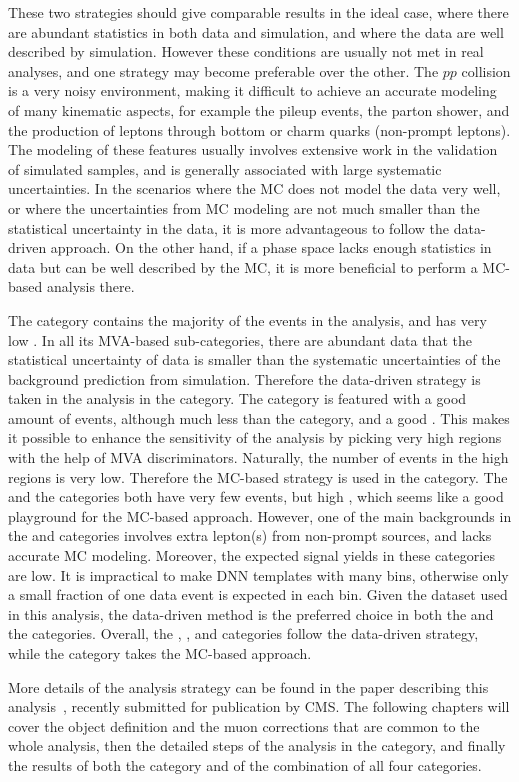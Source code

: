 These two strategies should give comparable results in the ideal case, where there are abundant statistics in both data and simulation,
and where the data are well described by simulation.
However these conditions are usually not met in real analyses, and one strategy may become preferable over the other.
The $pp$ collision is a very noisy environment, making it difficult to achieve an accurate modeling of many kinematic aspects,
for example the pileup events, the parton shower, and the production of leptons through bottom or charm quarks (non-prompt leptons).
The modeling of these features usually involves extensive work in the validation of simulated samples, and is generally associated with large systematic uncertainties.
In the scenarios where the MC does not model the data very well, or where the uncertainties from MC modeling are not much smaller than the statistical uncertainty in the data,
it is more advantageous to follow the data-driven approach.
On the other hand, if a phase space lacks enough statistics in data but can be well described by the MC, 
it is more beneficial to perform a MC-based analysis there.

The \ggH category contains the majority of the events in the \hmm analysis, and has very low \SoB. 
In all its MVA-based sub-categories, there are abundant data that the statistical uncertainty of data is smaller than the systematic uncertainties of the background prediction from simulation.
Therefore the data-driven strategy is taken in the analysis in the \ggH category.
The \qqH category is featured with a good amount of events, although much less than the \ggH category, and a good \SoB.
This makes it possible to enhance the sensitivity of the analysis by picking very high \SoB regions with the help of MVA discriminators. 
Naturally, the number of events in the high \SoB regions is very low. Therefore the MC-based strategy is used in the \qqH category.
The \VH and the \ttH categories both have very few events, but high \SoB, which seems like a good playground for the MC-based approach.
However, one of the main backgrounds in the \VH and \ttH categories involves extra lepton(s) from non-prompt sources, and lacks accurate MC modeling.
Moreover, the expected signal yields in these categories are low. 
It is impractical to make DNN templates with many bins, 
otherwise only a small fraction of one data event is expected in each bin.
Given the dataset used in this analysis, the data-driven method is the preferred choice in both the \VH and the \ttH categories.
Overall, the \ggH, \VH, and \ttH categories follow the data-driven strategy, while the \qqH category takes the MC-based approach.

More details of the analysis strategy can be found in the paper describing this analysis~\cite{Sirunyan_2021}, recently submitted for publication by CMS. 
The following chapters will cover the object definition and the muon corrections that are common to the whole analysis, 
then the detailed steps of the analysis in the \VH category, 
and finally the results of both the \VH category and of the combination of all four categories.
